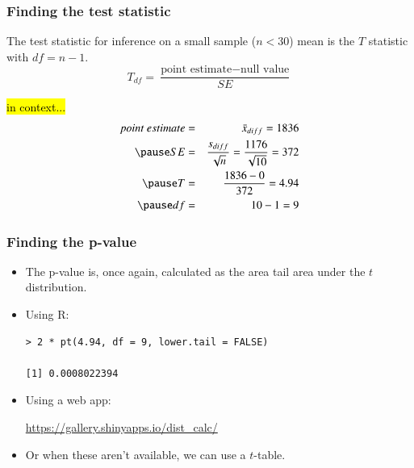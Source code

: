 
\begin{frame}
\frametitle{Finding the test statistic}

{The test statistic for inference on a small sample ($n < 30$) mean is the $T$ statistic with $df = n - 1$.
\[ T_{df} = \frac{\text{point estimate} - \text{null value}}{SE} \]}

\pause

\vspace{-0.5cm}

\hl{in context...}
\begin{eqnarray*}
point~estimate &=& \bar{x}_{diff} = 1836 \\
\pause
SE &=& \frac{s_{diff}}{\sqrt{n}} = \frac{1176}{\sqrt{10}} = 372 \\
\pause
T &=& \frac{1836 - 0}{372} = 4.94 \\
\pause
df &=& 10 - 1 = 9
\end{eqnarray*}

\vspace{-0.25cm}


\end{frame}


\begin{frame}[fragile]
\frametitle{Finding the p-value}

\begin{itemize}

\item The p-value is, once again, calculated as the area tail area under the $t$ distribution.

\pause

\item Using R:
\begin{verbatim}
> 2 * pt(4.94, df = 9, lower.tail = FALSE)

[1] 0.0008022394
\end{verbatim}

\pause

\item Using a web app:

\href{https://gallery.shinyapps.io/dist_calc/}{\textcolor{oiB}{https://gallery.shinyapps.io/dist\_calc/}}

\pause

\item Or when these aren't available, we can use a $t$-table.

\end{itemize}

\end{frame}

